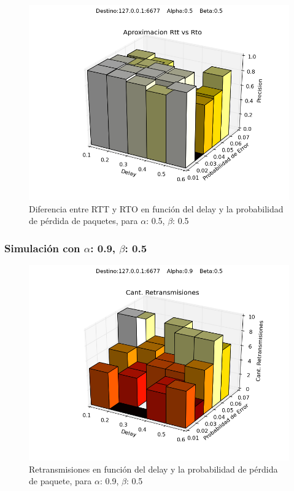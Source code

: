 \begin{figure}[H]
  \centering	
	\includegraphics[scale=0.5]{../analisis/graficos_tablas/graficos_en_funcion_de_delay_probaerror/0.5-0.5/rtt_vs_rto.png}
  \caption{Diferencia entre RTT y RTO en funci\'on del delay y la probabilidad de pérdida de paquetes, para $\alpha$: 0.5, $\beta$: 0.5}
	\label{fig:histo-src-sitiotrabajo}
\end{figure}









\subsubsection{Simulación con $\alpha$: 0.9, $\beta$: 0.5}
\begin{figure}[H]
  \centering	
	\includegraphics[scale=0.5]{../analisis/graficos_tablas/graficos_en_funcion_de_delay_probaerror/0.9-0.5/retransmisiones.png}
  \caption{Retransmisiones en funci\'on del delay y la probabilidad de pérdida de paquete, para $\alpha$: 0.9, $\beta$: 0.5}
	\label{fig:histo-src-sitiotrabajo}
\end{figure}

